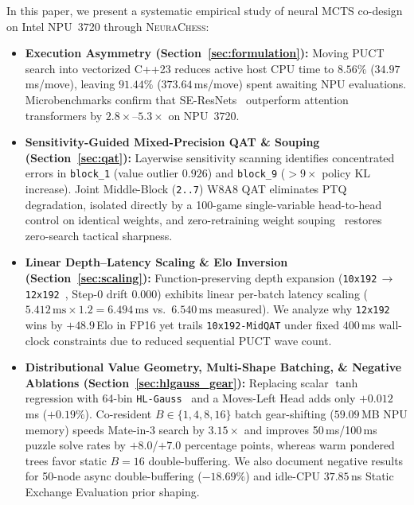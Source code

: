 \documentclass[10pt,twocolumn]{article}
\begin{document}
In this paper, we present a systematic empirical study of neural MCTS co-design on Intel NPU~3720 through \textsc{NeuraChess}:
\begin{itemize}
  \item \textbf{Execution Asymmetry (Section~\ref{sec:formulation}):} Moving PUCT search into vectorized C++23 reduces active host CPU time to $8.56\%$ ($34.97$\,ms/move), leaving $91.44\%$ ($373.64$\,ms/move) spent awaiting NPU evaluations. Microbenchmarks confirm that SE-ResNets~\cite{he2016resnet,hu2018senet} outperform attention transformers by $2.8\times$--$5.3\times$ on NPU~3720.
  \item \textbf{Sensitivity-Guided Mixed-Precision QAT \& Souping (Section~\ref{sec:qat}):} Layerwise sensitivity scanning identifies concentrated errors in \texttt{block\_1} (value outlier $0.926$) and \texttt{block\_9} ($>9\times$ policy KL increase). Joint Middle-Block (\texttt{2..7}) W8A8 QAT eliminates PTQ degradation, isolated directly by a 100-game single-variable head-to-head control on identical weights, and zero-retraining weight souping~\cite{wortsman2022modelsoups} restores zero-search tactical sharpness.
  \item \textbf{Linear Depth--Latency Scaling \& Elo Inversion (Section~\ref{sec:scaling}):} Function-preserving depth expansion (\texttt{10x192}\,$\to$\,\texttt{12x192}~\cite{chen2016net2net}, Step-0 drift $0.000$) exhibits linear per-batch latency scaling ($5.412\,\text{ms} \times 1.2 = 6.494\,\text{ms}$ vs.\ $6.540\,\text{ms}$ measured). We analyze why \texttt{12x192} wins by $+48.9$\,Elo in FP16 yet trails \texttt{10x192-MidQAT} under fixed $400$\,ms wall-clock constraints due to reduced sequential PUCT wave count.
  \item \textbf{Distributional Value Geometry, Multi-Shape Batching, \& Negative Ablations (Section~\ref{sec:hlgauss_gear}):} Replacing scalar $\tanh$ regression with 64-bin \texttt{HL-Gauss}~\cite{imani2018hlgauss,farebrother2024stop} and a Moves-Left Head adds only $+0.012$\,ms ($+0.19\%$). Co-resident $B\in\{1,4,8,16\}$ batch gear-shifting ($59.09$\,MB NPU memory) speeds Mate-in-3 search by $3.15\times$ and improves 50\,ms/100\,ms puzzle solve rates by $+8.0$/$+7.0$ percentage points, whereas warm pondered trees favor static $B=16$ double-buffering. We also document negative results for 50-node async double-buffering ($-18.69\%$) and idle-CPU $37.85$\,ns Static Exchange Evaluation prior shaping.

\end{itemize}
\end{document}
